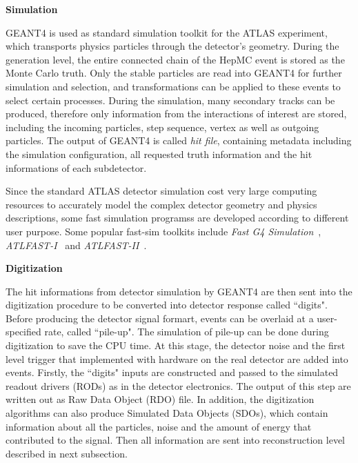\textbf{Simulation}

GEANT4 is used as standard simulation toolkit for the ATLAS experiment, which transports physics particles through the detector's geometry.
During the generation level, the entire connected chain of the HepMC event is stored as the Monte Carlo truth. 
Only the stable particles are read into GEANT4 for further simulation and selection, and transformations can be applied to these events to select certain processes.
During the simulation, many secondary tracks can be produced, therefore only information from the interactions of interest are stored, including the incoming particles, step sequence, vertex as well as outgoing particles.
The output of GEANT4 is called \textit{hit file}, containing metadata including the simulation configuration, all requested truth information and the hit informations of each subdetector.

Since the standard ATLAS detector simulation cost very large computing resources to accurately model the complex detector geometry and physics descriptions, some fast simulation programss are developed according to different user purpose.
Some popular fast-sim toolkits include \textit{Fast G4 Simulation}~\cite{Barberio:2007gba}, \textit{ATLFAST-I}~\cite{Richter-Was:683751} and \textit{ATLFAST-II}~\cite{Edmonds:1091969}.

\textbf{Digitization}

The hit informations from detector simulation by GEANT4 
are then sent into the digitization procedure to be converted into detector response called ``digits".
Before producing the detector signal formart, events can be overlaid at a user-specified rate, called ``pile-up".
The simulation of pile-up can be done during digitization to save the CPU time.
At this stage, the detector noise and the first level trigger that implemented with hardware on the real detector are added into events.
Firstly, the ``digits" inputs are constructed and passed to the simulated readout drivers (RODs) as in the detector electronics.
The output of this step are written out as Raw Data Object (RDO) file.
In addition, the digitization algorithms can also produce Simulated Data Objects (SDOs), which contain information about all the particles, noise and the amount of energy that contributed to the signal. 
Then all information are sent into reconstruction level described in next subsection.
